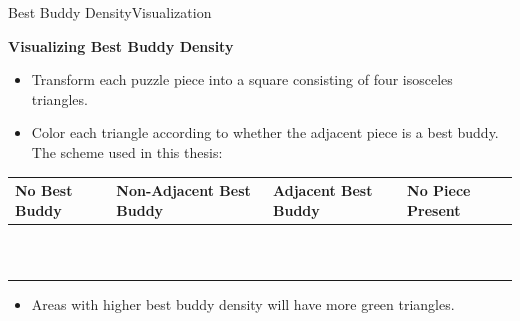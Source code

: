 \documentclass[10pt]{beamer}
\begin{document}
\begin{frame}{Best Buddy Density}{Visualization}  
  \begin{block}{\textbf{Visualizing Best Buddy Density}}
    \begin{itemize}
      \setlength\itemsep{1em}
      \item Transform each puzzle piece into a square consisting of four isosceles triangles.
      \item Color each triangle according to whether the adjacent piece is a best buddy.  The scheme used in this thesis:
    \end{itemize}
    {\footnotesize 
	    {\setlength\extrarowheight{2pt}
		    \begin{table}
		      \begin{center}
		        \begin{tabular}{ | >{\centering\arraybackslash}m{0.62in} | >{\centering\arraybackslash}m{0.78in} | >{\centering\arraybackslash}m{0.7in} | >{\centering\arraybackslash}m{0.62in} | }
		          \Xhline{1pt}
			        \textbf{No Best Buddy} 
			        & \textbf{Non-Adjacent Best Buddy}
			        & \textbf{Adjacent Best Buddy}
			        & \textbf{No Piece Present}
			        \\ \hline \hline
		          {\tiny \cellcolor{white}~} 
		          & {\tiny \cellcolor{red}~} 
		          & {\tiny \cellcolor{green}~} 
		          & {\tiny \cellcolor{black}~} 
		          \\
		          {\tiny \cellcolor{white}~} 
		          & {\tiny \cellcolor{red}~} 
		          & {\tiny \cellcolor{green}~} 
		          & {\tiny \cellcolor{black}~}
		          \\ \Xhline{1pt}
		        \end{tabular}
		      \end{center}
		    \end{table}
		  }}
    \begin{itemize}
      \setlength\itemsep{1em}
      \item Areas with higher best buddy density will have more green triangles.
    \end{itemize}
  \end{block}
\end{frame}
\end{document}
